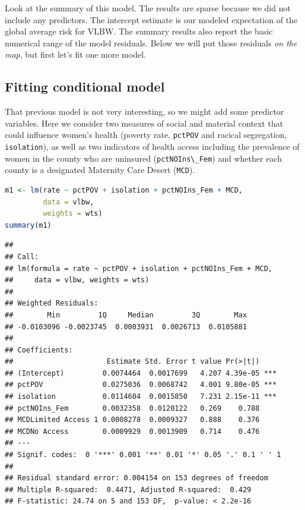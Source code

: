 \documentclass[
]{book}
\newcommand{\passthrough}[1]{#1}
\begin{document}
Look at the summary of this model. The results are sparse because we did not include any predictors. The intercept estimate is our modeled expectation of the global average risk for VLBW. The summary results also report the basic numerical range of the model residuals. Below we will put those residuals \emph{on the map}, but first let's fit one more model.

\hypertarget{fitting-conditional-model}{%
\subsection{Fitting conditional model}\label{fitting-conditional-model}}

That previous model is not very interesting, so we might add some predictor variables. Here we consider two measures of social and material context that could influence women's health (poverty rate, \passthrough{\lstinline!pctPOV!} and racical segregation, \passthrough{\lstinline!isolation!}), as well as two indicators of health access including the prevalence of women in the county who are uninsured (\passthrough{\lstinline!pctNOIns\_Fem!}) and whether each county is a designated Maternity Care Desert (\passthrough{\lstinline!MCD!}).

\begin{lstlisting}[language=R]
m1 <- lm(rate ~ pctPOV + isolation + pctNOIns_Fem + MCD,
         data = vlbw,
         weights = wts)
summary(m1)
\end{lstlisting}

\begin{lstlisting}
## 
## Call:
## lm(formula = rate ~ pctPOV + isolation + pctNOIns_Fem + MCD, 
##     data = vlbw, weights = wts)
## 
## Weighted Residuals:
##        Min         1Q     Median         3Q        Max 
## -0.0103096 -0.0023745  0.0003931  0.0026713  0.0105881 
## 
## Coefficients:
##                      Estimate Std. Error t value Pr(>|t|)    
## (Intercept)         0.0074464  0.0017699   4.207 4.39e-05 ***
## pctPOV              0.0275036  0.0068742   4.001 9.80e-05 ***
## isolation           0.0114604  0.0015850   7.231 2.15e-11 ***
## pctNOIns_Fem        0.0032358  0.0120122   0.269    0.788    
## MCDLimited Access 1 0.0008278  0.0009327   0.888    0.376    
## MCDNo Access        0.0009929  0.0013909   0.714    0.476    
## ---
## Signif. codes:  0 '***' 0.001 '**' 0.01 '*' 0.05 '.' 0.1 ' ' 1
## 
## Residual standard error: 0.004154 on 153 degrees of freedom
## Multiple R-squared:  0.4471,	Adjusted R-squared:  0.429 
## F-statistic: 24.74 on 5 and 153 DF,  p-value: < 2.2e-16
\end{lstlisting}
\end{document}
